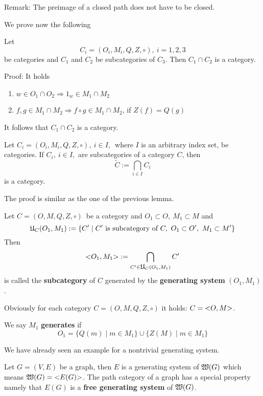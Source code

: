 Remark: The preimage of a closed path does not have to be closed.

We prove now the following
\begin{lemma}
Let \[ C_i = (O_i, M_i, Q, Z, \circ),\ i = 1, 2, 3 \] be categories and $C_1$
and $C_2$ be subcategories of $C_3$. Then $C_1 \cap C_2$ is a category.
\end{lemma}

Proof: It holds
\begin{enumerate}
  \item $w \in O_1 \cap O_2 \Rightarrow 1_w \in M_1 \cap M_2$
  \item $f, g \in M_1 \cap M_2 \Rightarrow f \circ g \in M_1 \cap M_2$, if
  $Z(f) = Q(g)$
\end{enumerate}

It follows that $C_1 \cap C_2$ is a category.

\begin{lemma}
Let $ C_i = (O_i, M_i, Q, Z, \circ),\ i \in I,$\ where $I$ is an arbitrary
index set, be categories. If $C_i,\ i \in I,$ are subcategories of a category
$C$, then 
\[ \tilde{C} := \bigcap_{i \in I} C_i \] 
is a category.
\end{lemma}

The proof is similar as the one of the previous lemma.

\begin{definition}
Let $C = (O, M, Q, Z, \circ)$\ be a category and $O_1 \subset O,\ M_1 \subset M$
and 
\[ \mbox{$\mathfrak{U}$}_C(O_1, M_1) := \{ C' \mid C'\text{ is subcategory of }C,\ O_1
\subset O',\ M_1 \subset M' \} \]
Then 
\[ \mbox{${<}O_1,M_1{>}$} := \bigcap_{C' \in \mbox{$\mathfrak{U}$}_C(O_1, M_1)} C' \]
is called the {\bf subcategory} of $C$ generated by the {\bf generating system}
$(O_1, M_1)$.
\end{definition}

Obviously for each category $C = (O, M, Q, Z, \circ)$ it holds: $C =
\mbox{${<}O,M{>}$}$.

We say $M_1$ {\bf generates}  if 
\[ O_1 = \{ Q(m) \mid m \in M_1 \} \cup \{ Z(M) \mid m \in M_1 \} \]

We have already seen an example for a nontrivial generating system.

Let $G=(V,E)$ be a graph, then $E$ is a generating system of $\mbox{$\mathfrak{W}(G)$}$
which means $\mbox{$\mathfrak{W}(G)$} = \mbox{${<}E(G){>}$}$. The path category of a graph
has a special property namely that $E(G)$ is a {\bf free generating system} of
$\mbox{$\mathfrak{W}(G)$}$.

